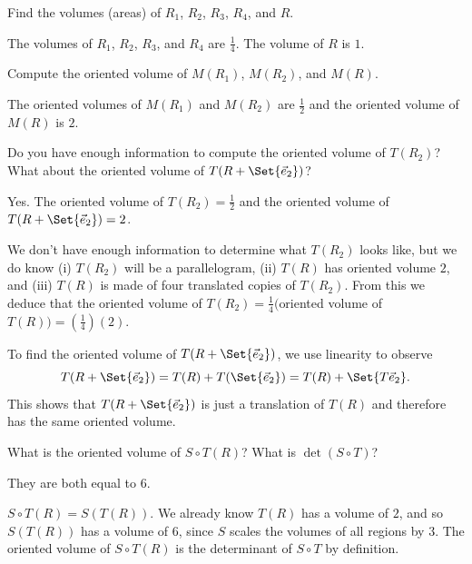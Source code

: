 	\begin{parts}
		\item Find the volumes (areas) of $R_1$, $R_2$, $R_3$, $R_4$, and $R$.
			\begin{solution}
				The volumes of $R_1$, $R_2$, $R_3$, and $R_4$ are $\tfrac{1}{4}$. The
				volume of $R$ is $1$.
			\end{solution}
		\item Compute the oriented volume of $M(R_1)$, $M(R_2)$, and $M(R)$.
			\begin{solution}
				The oriented volumes of $M(R_1)$ and $M(R_2)$ are $\tfrac{1}{2}$ and the oriented volume of
				$M(R)$ is $2$. 
			\end{solution}
		\item Do you have enough information to compute the oriented volume of $T(R_2)$? What about the oriented volume of $T(R+\Set{\yhat})$?
			\begin{solution}
				Yes. The oriented volume of $T(R_2)=\tfrac{1}{2}$ and the oriented volume of $T(R+\Set{\vec e_2})=2$.
				
				We don't have enough information to determine what $T(R_2)$ looks like, but we do know (i) $T(R_2)$ 
				will be a parallelogram, (ii) $T(R)$ has oriented volume $2$, and (iii) $T(R)$ is made of
				four translated copies of $T(R_2)$. From this we deduce that the oriented volume of $T(R_2)=\tfrac{1}{4}\big($oriented
				volume of $T(R)\big)=(\tfrac{1}{4})(2)$.

				To find the oriented volume of $T(R+\Set{\yhat})$, we use linearity to observe
				\[
					T(R+\Set{\yhat})=T(R)+T(\Set{\yhat}) = T(R)+\Set{T\yhat}.
				\]
				This shows that $T(R+\Set{\yhat})$ is just a translation of $T(R)$ and therefore has the same oriented volume.
			\end{solution}
%
		\item What is the oriented volume of $S\circ T(R)$? What is $\det(S\circ T)$?
			\begin{solution}
				They are both equal to $6$.

				$S\circ T(R)=S(T(R))$. We already know $T(R)$ has a volume
				of $2$, and so $S(T(R))$ has a volume of $6$, since $S$ scales
				the volumes of all regions by $3$. The oriented volume of $S\circ T(R)$
				is the determinant of $S\circ T$ by definition.
			\end{solution}
	\end{parts}

